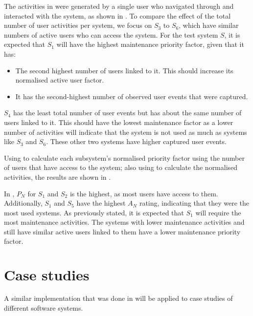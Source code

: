 The activities in  were generated by a single user who navigated through and interacted with the system, as shown in . To compare the effect of the total number of user activities per system, we focus on $S_3$ to $S_6$, which have similar numbers of active users who can access the system. For the test system $S$, it is expected that $S_1$ will have the highest maintenance priority factor, given that it has:

\begin{itemize}
	\item The second highest number of users linked to it. This should increase its normalised active user factor.
	\item It has the second-highest number of observed user events that were captured.
\end{itemize}

$S_4$ has the least total number of user events but has about the same number of users linked to it. This should have the lowest maintenance factor as a lower number of activities will indicate that the system is not used as much as systems like $S_3$ and $S_6$. These other two systems have higher captured user events.\par Using  to calculate each subsystem's normalised priority factor using the number of users that have access to the system; also using  to calculate the normalised activities, the results are shown in .



In , $P_N$ for $S_1$ and $S_2$ is the highest, as most users have access to them. Additionally, $S_1$ and $S_5$ have the highest $A_N$ rating, indicating that they were the most used systems. As previously stated, it is expected that $S_1$ will require the most maintenance activities. The systems with lower maintenance activities and still have similar active users linked to them have a lower maintenance priority factor.

\clearpage

\section{Case studies}
A similar implementation that was done in  will be applied to case studies of different software systems.


